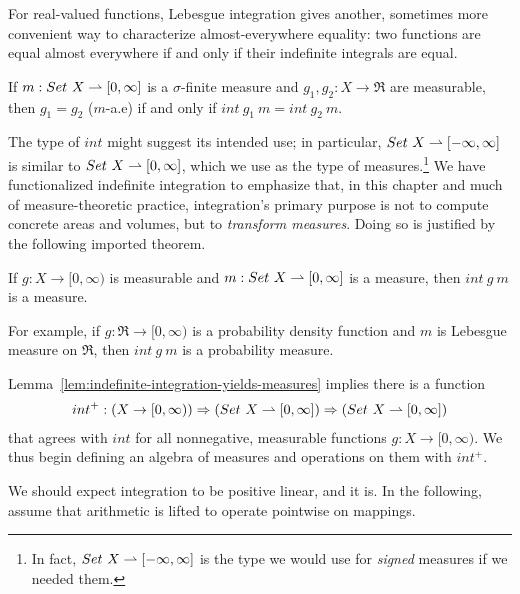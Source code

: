 For real-valued functions, Lebesgue integration gives another, sometimes more convenient way to characterize almost-everywhere equality: two functions are equal almost everywhere if and only if their indefinite integrals are equal.
\begin{lemma}
\label{lem:real-almost-everywhere-equality}
If $m : Set~X \rightharpoonup [0,\infty]$ is a $\sigma$-finite measure and $g_1,g_2 : X \to \Re$ are measurable, then $g_1 = g_2$ ($m$-a.e) if and only if $int~g_1~m = int~g_2~m$.
\end{lemma}

The type of $int$ might suggest its intended use; in particular, $Set~X \rightharpoonup [-\infty,\infty]$ is similar to $Set~X \rightharpoonup [0,\infty]$, which we use as the type of measures.\footnote{In fact, $Set~X \rightharpoonup [-\infty,\infty]$ is the type we would use for \emph{signed} measures if we needed them.}
We have functionalized indefinite integration to emphasize that, in this chapter and much of measure-theoretic practice, integration's primary purpose is not to compute concrete areas and volumes, but to \emph{transform measures}.
Doing so is justified by the following imported theorem.

\begin{lemma}
\label{lem:indefinite-integration-yields-measures}
If $g : X \to [0,\infty)$ is measurable and $m : Set~X \rightharpoonup [0,\infty]$ is a measure, then $int~g~m$ is a measure.
\end{lemma}

For example, if $g : \Re \to [0,\infty)$ is a probability density function and $m$ is Lebesgue measure on $\Re$, then $int~g~m$ is a probability measure.

Lemma~\ref{lem:indefinite-integration-yields-measures} implies there is a function
\begin{equation}
\begin{aligned}
	int^+ : (X \to [0,\infty)) \Rightarrow (Set~X \rightharpoonup [0,\infty]) \Rightarrow (Set~X \rightharpoonup [0,\infty])
\end{aligned}
\end{equation}
that agrees with $int$ for all nonnegative, measurable functions $g : X \to [0,\infty)$.
We thus begin defining an algebra of measures and operations on them with $int^+$.

We should expect integration to be positive linear, and it is.
In the following, assume that arithmetic is lifted to operate pointwise on mappings.

